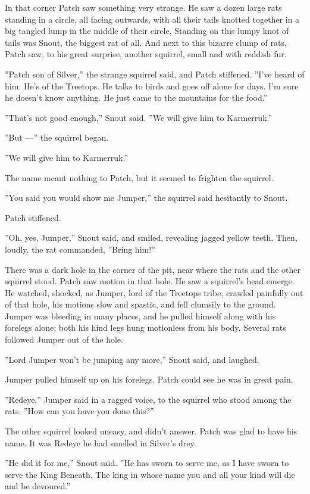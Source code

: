 \documentclass[12pt]{book}
\begin{document}
In that corner Patch saw something very strange. He saw a dozen large
rats standing in a circle, all facing outwards, with all their tails
knotted together in a big tangled lump in the middle of their
circle. Standing on this lumpy knot of tails was Snout, the biggest
rat of all. And next to this bizarre clump of rats, Patch saw, to his
great surprise, another squirrel, small and with reddish fur.

''Patch son of Silver,'' the strange squirrel said, and Patch
stiffened. ''I've heard of him. He's of the Treetops. He talks to
birds and goes off alone for days. I'm sure he doesn't know
anything. He just came to the mountains for the food.''

''That's not good enough,'' Snout said. ''We will give him to
Karmerruk.''

''But ---'' the squirrel began.

''We will give him to Karmerruk.''

The name meant nothing to Patch, but it seemed to frighten the
squirrel.

''You said you would show me Jumper,'' the squirrel said hesitantly to
Snout.

Patch stiffened.

''Oh, yes, Jumper,'' Snout said, and smiled, revealing jagged yellow
teeth. Then, loudly, the rat commanded, ''Bring him!''

There was a dark hole in the corner of the pit, near where the rats
and the other squirrel stood. Patch saw motion in that hole. He saw a
squirrel's head emerge. He watched, shocked, as Jumper, lord of the
Treetops tribe, crawled painfully out of that hole, his motions slow
and spastic, and fell clumsily to the ground. Jumper was bleeding in
many places, and he pulled himself along with his forelegs alone; both
his hind legs hung motionless from his body. Several rats followed
Jumper out of the hole.

''Lord Jumper won't be jumping any more,'' Snout said, and laughed.

Jumper pulled himself up on his forelegs. Patch could see he was in
great pain.

''Redeye,'' Jumper said in a ragged voice, to the squirrel who stood
among the rats. ''How can you have you done this?''

The other squirrel looked uneasy, and didn't answer. Patch was glad to
have his name. It was Redeye he had smelled in Silver's drey.

''He did it for me,'' Snout said. ''He has sworn to serve me, as I
have sworn to serve the King Beneath. The king in whose name you and
all your kind will die and be devoured.''
\end{document}
